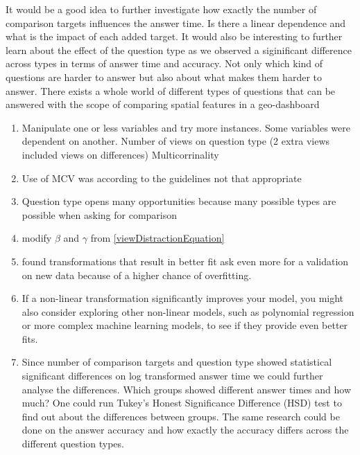 It would be a good idea to further investigate how exactly the number of comparison targets influences the answer time. Is there a linear dependence and what is the impact of
each added target.
It would also be interesting to further learn about the effect of the question type as we observed a siginificant difference across types in terms of answer time and accuracy.
Not only which kind of questions are harder to answer but also about what makes
them harder to answer. There exists a whole world of different types of questions that can be answered with the scope of comparing spatial features in a geo-dashboard

\begin{enumerate}
    \item Manipulate one or less variables and try more instances. Some variables were dependent on another. Number of views
    on question type (2 extra views included views on differences) Multicorrinality
    \item Use of MCV was according to the guidelines not that appropriate
    \item Question type opens many opportunities because many possible types are possible when asking for comparison
    \item modify $\beta$ and $\gamma$ from \ref{viewDistractionEquation}
    \item found transformations that result in better fit ask even more for a validation on new data because of a higher 
    chance of overfitting.
    \item If a non-linear transformation significantly improves your model, you might also consider exploring other non-linear models, such as polynomial regression or more complex machine learning models, to see if they provide even better fits.
    \item Since number of comparison targets and question type showed statistical significant differences on log transformed answer time we could further analyse the differences. Which groups showed different answer times and how much?
    One could run Tukey's Honest Significance Difference (HSD) test to find out about the differences between groups. The same research could be done on the answer accuracy and how exactly the accuracy differs across the different question types.

\end{enumerate}